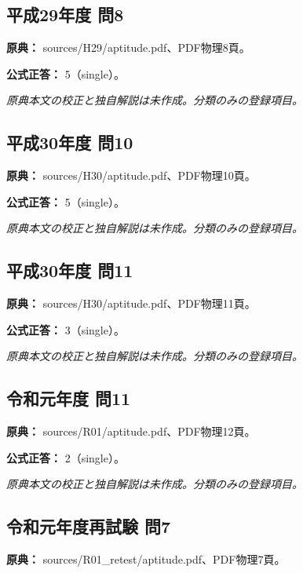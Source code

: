 \subsection{平成29年度 問8}
\label{q:h29-reg-apt-08}

\noindent\textbf{原典：} sources/H29/aptitude.pdf、PDF物理8頁。

\textbf{公式正答：} 5（single）。

\par\textit{原典本文の校正と独自解説は未作成。分類のみの登録項目。}

\subsection{平成30年度 問10}
\label{q:h30-reg-apt-10}

\noindent\textbf{原典：} sources/H30/aptitude.pdf、PDF物理10頁。

\textbf{公式正答：} 5（single）。

\par\textit{原典本文の校正と独自解説は未作成。分類のみの登録項目。}

\subsection{平成30年度 問11}
\label{q:h30-reg-apt-11}

\noindent\textbf{原典：} sources/H30/aptitude.pdf、PDF物理11頁。

\textbf{公式正答：} 3（single）。

\par\textit{原典本文の校正と独自解説は未作成。分類のみの登録項目。}

\subsection{令和元年度 問11}
\label{q:r01-reg-apt-11}

\noindent\textbf{原典：} sources/R01/aptitude.pdf、PDF物理12頁。

\textbf{公式正答：} 2（single）。

\par\textit{原典本文の校正と独自解説は未作成。分類のみの登録項目。}

\subsection{令和元年度再試験 問7}
\label{q:r01-ret-apt-07}

\noindent\textbf{原典：} sources/R01\_retest/aptitude.pdf、PDF物理7頁。

